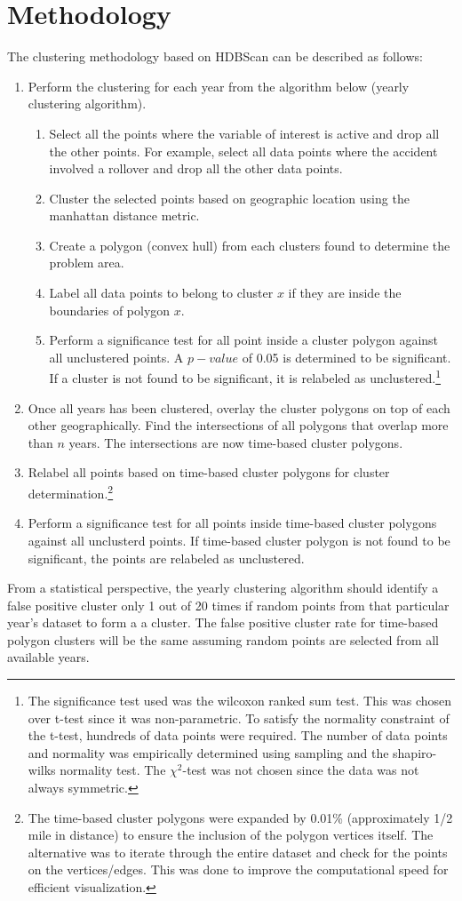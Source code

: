 \documentclass{article}
\begin{document}
\section{Methodology}
The clustering methodology based on HDBScan can be described as follows:
\begin{enumerate}
	\item Perform the clustering for each year from the algorithm below (yearly clustering algorithm).
	\begin{enumerate}
			\item Select all the points where the variable of interest is active and drop all the other points. For example, select all data points where the accident involved a rollover and drop all the other data points.
			\item Cluster the selected points based on geographic location using the manhattan distance metric.
			\item Create a polygon (convex hull) from each clusters found to determine the problem area.
			\item Label all data points to belong to cluster $x$ if they are inside the boundaries of polygon $x$.
			\item Perform a significance test for all point inside a cluster polygon against all unclustered points. A $p-value$ of 0.05 is determined to be significant. If a cluster is not found to be significant, it is relabeled as unclustered.\footnote{The significance test used was the wilcoxon ranked sum test. This was chosen over t-test since it was non-parametric. To satisfy the normality constraint of the t-test, hundreds of data points were required. The number of data points and normality was empirically determined using sampling and the shapiro-wilks normality test. The $\chi^2$-test was not chosen since the data was not always symmetric.}
	\end{enumerate}
	\item Once all years has been clustered, overlay the cluster polygons on top of each other geographically. Find the intersections of all polygons that overlap more than $n$ years. The intersections are now time-based cluster polygons.
	\item Relabel all points based on time-based cluster polygons for cluster determination.\footnote{The time-based cluster polygons were expanded by 0.01\% (approximately 1/2 mile in distance) to ensure the inclusion of the polygon vertices itself. The alternative was to iterate through the entire dataset and check for the points on the vertices/edges. This was done to improve the computational speed for efficient visualization.}
	\item Perform a significance test for all points inside time-based cluster polygons against all unclusterd points. If time-based cluster polygon is not found to be significant, the points are relabeled as unclustered.
\end{enumerate}
From a statistical perspective, the yearly clustering algorithm should identify a false positive cluster only 1 out of 20 times if random points from that particular year's dataset to form a a cluster. The false positive cluster rate for time-based polygon clusters will be the same assuming random points are selected from all available years.
\end{document}
